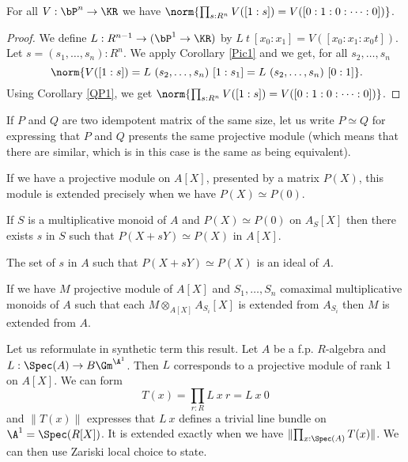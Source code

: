 \begin{proposition}\label{trivial1}
  For all $V:\bP^n\rightarrow \KR$ we have $\norm{\prod_{s:R^n}V([1:s]) = V([0:1:0:\cdots :0])}$.
\end{proposition}

\begin{proof}
  We define $L:R^{n-1}\rightarrow (\bP^1 \to \KR)$ by $L~t~[x_0:x_1] = V([x_0:x_1:x_0t])$.
  Let $s=(s_1,\dots,s_{n}):R^{n}$. We apply Corollary \ref{Pic1} and we get, for all $s_2,\dots,s_n$
  \[
   \norm{V([1:s]) = L~(s_2,\dots,s_n)~[1:s_1] = L~(s_2,\dots,s_n)~[0:1]}
   \rlap{.}
   \]
   Using Corollary \ref{QP1}, we get $\norm{\prod_{s:R^n}V([1:s]) = V([0:1:0:\cdots :0])}$.
\end{proof}








If $P$ and $Q$ are two idempotent matrix of the same size, let us write $P\simeq Q$ for expressing that $P$ and $Q$ presents
the same projective module (which means that there are similar, which is in this case is the same as being equivalent).

If we have a projective module on $A[X]$, presented by a matrix $P(X)$, this module is extended
precisely when we have $P(X)\simeq P(0)$.

\begin{lemma}
  If $S$ is a multiplicative monoid of $A$ and $P(X)\simeq P(0)$ on $A_S[X]$ then there exists
  $s$ in $S$ such that $P(X+sY)\simeq P(X)$ in $A[X]$.
\end{lemma}

\begin{lemma}
  The set of $s$ in $A$ such that $P(X+sY)\simeq P(X)$ is an ideal of $A$.
\end{lemma}

\begin{corollary}
  If we have $M$ projective module of $A[X]$ and $S_1,\dots,S_n$ comaximal multiplicative monoids of $A$
  such that each $M\otimes_{A[X]} A_{S_i}[X]$ is extended from $A_{S_i}$ then $M$ is extended from $A$.
\end{corollary}

Let us reformulate in synthetic term this result. Let $A$ be a f.p. $R$-algebra and $L:\Spec(A)\rightarrow B\Gm^{\A^1}$.
Then $L$ corresponds to a projective module of rank $1$ on $A[X]$. We can form
$$T(x) = \prod_{r:R}L~x~r = L~x~0$$
and $\|T(x)\|$ expresses that $L~x$ defines a trivial line bundle on $\A^1 = \Spec(R[X])$.
It is extended exactly when we have
$\|{\prod_{x:\Spec(A)}T(x)}\|$. We can then use Zariski local choice to state.

